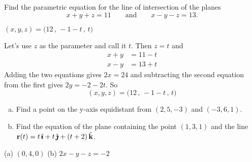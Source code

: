\begin{question}[M200 2015D] %
Find the parametric equation for the line of intersection of the 
planes
\begin{equation*}
x + y + z = 11\qquad \text{and}\qquad x - y - z = 13.
\end{equation*}
\end{question}

%

\begin{answer}
$(x,y,z) = \big(12\,,\,-1-t\,,\,t\big)$
\end{answer}

\begin{solution}
Let's use $z$ as the parameter and call it $t$. Then $z=t$
and
\begin{align*}
x+y&=11-t \\
x-y&=13+t
\end{align*}
Adding the two equations gives $2x=24$ and subtracting the
second equation from the first gives $2y=-2-2t$. So
\begin{equation*}
(x,y,z) = \big(12\,,\,-1-t\,,\,t\big)
\end{equation*}
\end{solution}

\begin{question}[M200 2000A] %
\begin{enumerate}[(a)]
\item
Find a point on the y-axis equidistant from 
                $(2, 5, -3)$ and $(-3, 6, 1)$. 

\item  
Find the equation of the plane containing the point 
           $(1, 3, 1)$ and the line $\mathbf{r}(t) = t\,\hat{\pmb{\imath}} + t\,\hat{\pmb{\jmath}} + (t + 2)\,\hat{\mathbf{k}}$.
\end{enumerate}
\end{question}

%

\begin{answer}
(a) $(0,4,0)$\qquad
(b) $2x-y-z=-2$
\end{answer}

